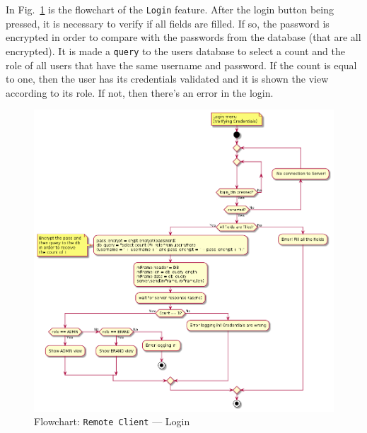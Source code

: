 In Fig.~\ref{fig:flow-rc-login} is the flowchart of the \texttt{Login} feature.
After the login button being pressed, it is necessary to verify if all fields are filled. If so, the password is encrypted in order to compare with the passwords from the database (that are all encrypted).
It is made a \texttt{query} to the users database to select a count and the role of all users that have the same username and password.
If the count is equal to one, then the user has its credentials validated and it is shown the view according to its role. If not, then there's an error in the login.
%
\begin{figure}[htb!]
\centering
    \includegraphics[width=0.8\columnwidth]{./img/flow-rc-login.png}
  \caption{Flowchart: \texttt{Remote Client} --- Login}%
\label{fig:flow-rc-login}
\end{figure}

